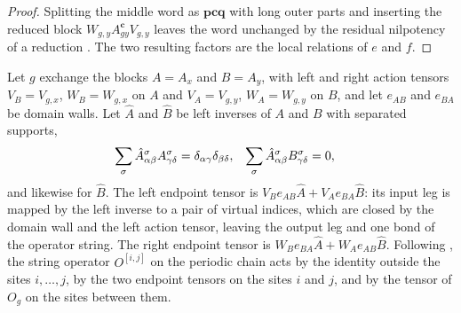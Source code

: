 \begin{proof}\leanok
    Splitting the middle word as $\mathbf p\mathbf c\mathbf q$ with long
    outer parts and inserting the reduced block
    $W_{g,y}A_{gy}^{\mathbf c}V_{g,y}$ leaves the word unchanged by the
    residual nilpotency of a reduction \cite{Molnar2018SemiInjective}. The
    two resulting factors are the local relations of $e$ and $f$.
\end{proof}

\begin{definition}
    \label{def:mpug_domain_wall_string}
    \leanok
    Let $g$ exchange the blocks $A=A_x$ and $B=A_y$, with left and right action
    tensors $V_B=V_{g,x}$, $W_B=W_{g,x}$ on $A$ and $V_A=V_{g,y}$,
    $W_A=W_{g,y}$ on $B$, and let $e_{AB}$ and $e_{BA}$ be domain walls. Let
    $\hat A$ and $\hat B$ be left inverses of $A$ and $B$ with separated
    supports,
    \begin{align}
        \sum_\sigma \hat A^\sigma_{\alpha\beta}A^\sigma_{\gamma\delta}
         & =\delta_{\alpha\gamma}\delta_{\beta\delta},
         &
        \sum_\sigma \hat A^\sigma_{\alpha\beta}B^\sigma_{\gamma\delta}
         & =0,
        \notag
    \end{align}
    and likewise for $\hat B$. The left endpoint tensor is
    $V_Be_{AB}\hat A+V_Ae_{BA}\hat B$: its input leg is mapped by the left
    inverse to a pair of virtual indices, which are closed by the domain wall
    and the left action tensor, leaving the output leg and one bond of the
    operator string. The right endpoint tensor is
    $W_Be_{BA}\hat A+W_Ae_{AB}\hat B$. Following
    \cite[Section~III.E]{GarreRubioSchuch2024DomainWall}, the string
    operator $O^{[i,j]}$ on the periodic chain acts by the identity outside
    the sites $i,\dots,j$, by the two endpoint tensors on the sites $i$ and
    $j$, and by the tensor of $O_g$ on the sites between them.
\end{definition}

